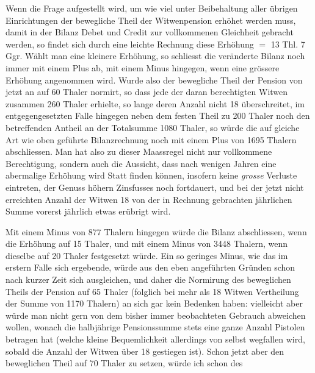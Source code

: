 Wenn die Frage aufgestellt wird, um wie viel unter Beibehaltung aller übrigen Einrichtungen der bewegliche Theil der Witwenpension erhöhet werden muss, damit in der Bilanz Debet und Credit zur vollkommenen Gleichheit gebracht werden, so findet sich durch eine leichte Rechnung diese Erhöhung \(=\) 13 Thl. 7 Ggr. Wählt man eine kleinere Erhöhung, so schliesst die veränderte Bilanz noch immer mit einem Plus ab, mit einem Minus hingegen, wenn eine grössere Erhöhung angenommen wird. Wurde also der bewegliche Theil der Pension von jetzt an auf 60 Thaler normirt, so dass jede der daran berechtigten Witwen zusammen 260 Thaler erhielte, so lange deren Anzahl nicht 18 überschreitet, im entgegengesetzten Falle hingegen neben dem festen Theil zu 200 Thaler noch den betreffenden Antheil an der Totalsumme 1080 Thaler, so würde die auf gleiche Art wie oben geführte Bilanzrechnung noch mit einem Plus von 1695 Thalern abschliessen. Man hat also zu dieser Maassregel nicht nur vollkommene Berechtigung, sondern auch die Aussicht, dass nach wenigen Jahren eine abermalige Erhöhung wird Statt finden können, insofern keine \textit{grosse} Verluste eintreten, der Genuss höhern Zinsfusses noch fortdauert, und bei der jetzt nicht erreichten Anzahl der Witwen 18 von der in Rechnung gebrachten jährlichen Summe vorerst jährlich etwas erübrigt wird.

Mit einem Minus von 877 Thalern hingegen würde die Bilanz abschliessen, wenn die Erhöhung auf 15 Thaler, und mit einem Minus von 3448 Thalern, wenn dieselbe auf 20 Thaler festgesetzt würde. Ein so geringes Minus, wie das im erstern Falle sich ergebende, würde aus den eben angeführten Gründen schon nach kurzer Zeit sich ausgleichen, und daher die Normirung des beweglichen Theils der Pension auf 65 Thaler (folglich bei mehr als 18 Witwen Vertheilung der Summe von 1170 Thalern) an sich gar kein Bedenken haben: vielleicht aber würde man nicht gern von dem bisher immer beobachteten Gebrauch abweichen wollen, wonach die halbjährige Pensionssumme stets eine ganze Anzahl Pistolen betragen hat (welche kleine Bequemlichkeit allerdings von selbst wegfallen wird, sobald die Anzahl der Witwen über 18 gestiegen ist). Schon jetzt aber den beweglichen Theil auf 70 Thaler zu setzen, würde ich schon des

